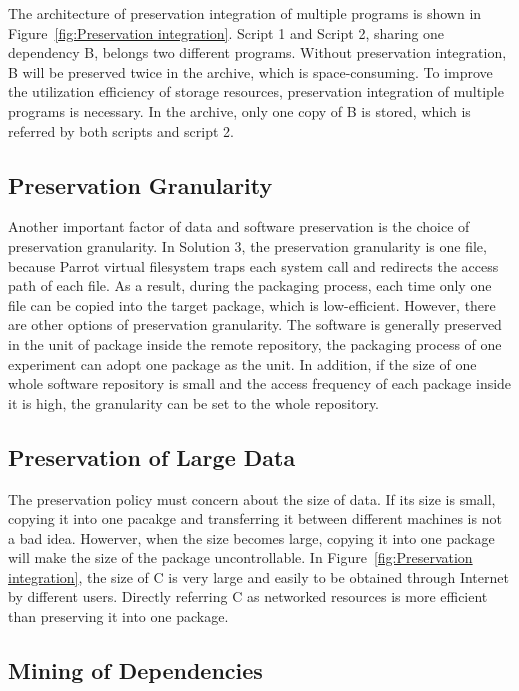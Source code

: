 \documentclass{acm_proc_article-sp}
\begin{document}
The architecture of preservation integration of multiple programs is shown in
Figure~\ref{fig:Preservation integration}. Script 1 and Script 2, sharing one
dependency B, belongs two different programs. Without preservation
integration, B will be preserved twice in the archive, which is
space-consuming. To improve the utilization efficiency of storage resources,
preservation integration of multiple programs is necessary. In the archive,
only one copy of B is stored, which is referred by both scripts and script 2.

\subsection{Preservation Granularity}

Another important factor of data and software preservation is the choice of
preservation granularity. In Solution 3, the preservation granularity is one
file, because Parrot virtual filesystem traps each system call and redirects
the access path of each file. As a result, during the packaging process, each
time only one file can be copied into the target package, which is
low-efficient. However, there are other options of preservation granularity.
The software is generally preserved in the unit of package inside the remote
repository, the packaging process of one experiment can adopt one package as
the unit. In addition, if the size of one whole software repository is small
and the access frequency of each package inside it is high, the granularity can
be set to the whole repository.

\subsection{Preservation of Large Data}

The preservation policy must concern about the size of data. If its size is
small, copying it into one pacakge and transferring it between different
machines is not a bad idea. Howerver, when the size becomes large, copying it
into one package will make the size of the package uncontrollable. In
Figure~\ref{fig:Preservation integration}, the size of C is very large and
easily to be obtained through Internet by different users. Directly referring C
as networked resources is more efficient than preserving it into one package.

\subsection{Mining of Dependencies} 
\end{document}
